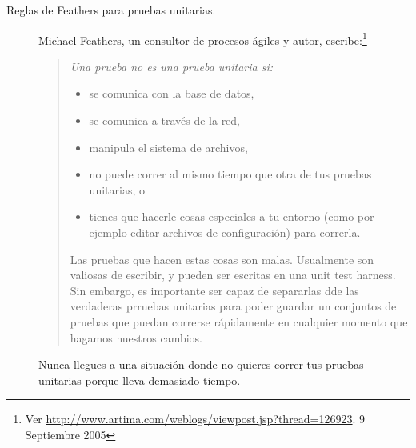 \documentclass[a4paper,10pt,twoside]{book}
\begin{document}
\begin{description}


\item[Reglas de Feathers para pruebas unitarias.]
  Michael Feathers, un consultor de procesos \'agiles y autor, escribe:\footnote{Ver \url{http://www.artima.com/weblogs/viewpost.jsp?thread=126923}. 9 Septiembre 2005} 
  \begin{quotation}
  \noindent
  {\it
	Una prueba no es una prueba unitaria si:  
  \begin{itemize}
	\item se comunica con la base de datos,
	\item se comunica a trav\'es de la red,
	\item manipula el sistema de archivos,
	\item no puede correr al mismo tiempo que otra de tus pruebas unitarias, o
	\item tienes que hacerle cosas especiales a tu entorno (como por ejemplo editar archivos de configuraci\'on) para correrla.
 \end{itemize}

Las pruebas que hacen estas cosas son malas. Usualmente son valiosas de escribir, y pueden ser escritas
en una unit test harness.
Sin embargo, es importante ser capaz de separarlas dde las verdaderas prruebas unitarias para poder
guardar un conjuntos de pruebas que puedan correrse r\'apidamente en cualquier momento que hagamos nuestros
cambios.
 }
  \end{quotation}

Nunca llegues a una situaci\'on donde no quieres correr tus pruebas unitarias porque
lleva demasiado tiempo.



\end{description}
\end{document}
